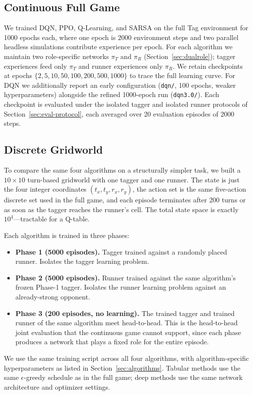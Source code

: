 \documentclass[conference]{IEEEtran}
\begin{document}
\subsection{Continuous Full Game}\label{sec:exp-full}

We trained DQN, PPO, Q-Learning, and SARSA on the full Tag environment
for 1000 epochs each, where one epoch is 2000 environment steps and two
parallel headless simulations contribute experience per epoch. For each
algorithm we maintain two role-specific networks $\pi_T$ and $\pi_R$
(Section~\ref{sec:dualrole}); tagger experiences feed only $\pi_T$ and
runner experiences only $\pi_R$. We retain checkpoints at epochs
$\{2, 5, 10, 50, 100, 200, 500, 1000\}$ to trace the full learning
curve. For DQN we additionally report an early configuration
(\texttt{dqn/}, 100 epochs, weaker hyperparameters) alongside the
refined 1000-epoch run (\texttt{dqn3.0/}). Each checkpoint is
evaluated under the isolated
tagger and isolated runner protocols of Section~\ref{sec:eval-protocol},
each averaged over 20 evaluation episodes of 2000 steps.

\subsection{Discrete Gridworld}\label{sec:exp-grid}

To compare the same four algorithms on a structurally simpler task, we
built a $10{\times}10$ turn-based gridworld with one tagger and one
runner. The state is just the four integer coordinates
$(t_x, t_y, r_x, r_y)$, the action set is the same five-action discrete
set used in the full game, and each episode terminates after 200 turns
or as soon as the tagger reaches the runner's cell. The total state
space is exactly $10^4$---tractable for a Q-table.

Each algorithm is trained in three phases:
\begin{itemize}
    \item \textbf{Phase 1 (5000 episodes).} Tagger trained against a
    randomly placed runner. Isolates the tagger learning problem.
    \item \textbf{Phase 2 (5000 episodes).} Runner trained against the
    same algorithm's frozen Phase-1 tagger. Isolates the runner
    learning problem against an already-strong opponent.
    \item \textbf{Phase 3 (200 episodes, no learning).} The trained
    tagger and trained runner of the same algorithm meet head-to-head.
    This is the head-to-head joint evaluation that the continuous game
    cannot support, since each phase produces a network that plays a
    fixed role for the entire episode.
\end{itemize}
We use the same training script across all four algorithms, with
algorithm-specific hyperparameters as listed in
Section~\ref{sec:algorithms}. Tabular methods use the same
$\epsilon$-greedy schedule as in the full game; deep methods use the
same network architecture and optimizer settings.
\end{document}
